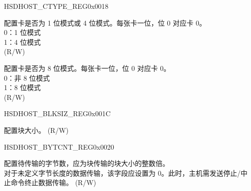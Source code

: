 \begin{register}{H}{SDHOST\_CTYPE\_REG}{0x0018}\label{regdesc:SDHOSTCTYPEREG}
%
%
%
%
\regnewline%
\begin{regdesc}\begin{reglist}
\label{fielddesc:SDHOSTCARDWIDTH4}\item [SDHOST\_CARD\_WIDTH4] 配置卡是否为 1 位模式或 4 位模式。每张卡一位，位 0 对应卡 0。\\
0：1 位模式\\
1：4 位模式\\
 (R/W)
\label{fielddesc:SDHOSTCARDWIDTH8}\item [SDHOST\_CARD\_WIDTH8] 配置卡是否为 8 位模式。每张卡一位，位 0 对应卡 0。\\
0：非 8 位模式\\
1：8 位模式\\
 (R/W)
\end{reglist}\end{regdesc}
\end{register}


\begin{register}{H}{SDHOST\_BLKSIZ\_REG}{0x001C}\label{regdesc:SDHOSTBLKSIZREG}
%
%
\regnewline%
\begin{regdesc}\begin{reglist}
\label{fielddesc:SDHOSTBLOCKSIZE}\item [SDHOST\_BLOCK\_SIZE] 配置块大小。 (R/W)
\end{reglist}\end{regdesc}
\end{register}


\begin{register}{H}{SDHOST\_BYTCNT\_REG}{0x0020}\label{regdesc:SDHOSTBYTCNTREG}
%
\regnewline%
\begin{regdesc}\begin{reglist}
\label{fielddesc:SDHOSTBYTECOUNT}\item [SDHOST\_BYTE\_COUNT] 配置待传输的字节数，应为块传输的块大小的整数倍。\\
对于未定义字节长度的数据传输，该字段应设置为 0。此时，主机需发送停止/中止命令终止数据传输。 (R/W)
\end{reglist}\end{regdesc}
\end{register}


